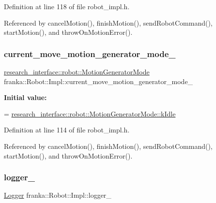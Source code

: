 Definition at line 118 of file robot\+\_\+impl.\+h.



Referenced by cancel\+Motion(), finish\+Motion(), send\+Robot\+Command(), start\+Motion(), and throw\+On\+Motion\+Error().

\mbox{\label{classfranka_1_1Robot_1_1Impl_a2fecb29212c55738e284b2ba8249ad5c}} 
\subsubsection{\texorpdfstring{current\+\_\+move\+\_\+motion\+\_\+generator\+\_\+mode\+\_\+}{current\_move\_motion\_generator\_mode\_}}
{\footnotesize\ttfamily \hyperlink{namespaceresearch__interface_1_1robot_abd2451eb963a1843f1eb066ebd4b06e8}{research\+\_\+interface\+::robot\+::\+Motion\+Generator\+Mode} franka\+::\+Robot\+::\+Impl\+::current\+\_\+move\+\_\+motion\+\_\+generator\+\_\+mode\+\_\+\hspace{0.3cm}{\ttfamily [private]}}

{\bfseries Initial value\+:}
\begin{DoxyCode}
=
      \hyperlink{namespaceresearch__interface_1_1robot_abd2451eb963a1843f1eb066ebd4b06e8af5137a026a4b2f3b1c8a21cfc60dd14b}{research\_interface::robot::MotionGeneratorMode::kIdle}
\end{DoxyCode}


Definition at line 114 of file robot\+\_\+impl.\+h.



Referenced by cancel\+Motion(), finish\+Motion(), send\+Robot\+Command(), start\+Motion(), and throw\+On\+Motion\+Error().

\mbox{\label{classfranka_1_1Robot_1_1Impl_a404078ee04a4786f61d991b71d2dc1ff}} 
\subsubsection{\texorpdfstring{logger\+\_\+}{logger\_}}
{\footnotesize\ttfamily \hyperlink{classfranka_1_1Logger}{Logger} franka\+::\+Robot\+::\+Impl\+::logger\+\_\+\hspace{0.3cm}{\ttfamily [private]}}



